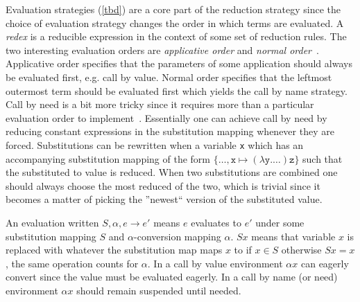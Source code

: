\documentclass[11pt,oneside,a4paper]{report}
\begin{document}
Evaluation strategies (\autoref{tbd}) are a core part of the reduction strategy since the choice of evaluation strategy changes the order in which terms are evaluated.
A \textit{redex} is a reducible expression in the context of some set of reduction rules.
The two interesting evaluation orders are \textit{applicative order} and \textit{normal order}~\cite{sestoft2002demonstrating}.
Applicative order specifies that the parameters of some application should always be evaluated first, e.g. call by value.
Normal order specifies that the leftmost outermost term should be evaluated first which yields the call by name strategy.
Call by need is a bit more tricky since it requires more than a particular evaluation order to implement~\cite{levy1988sharing}.
Essentially one can achieve call by need by reducing constant expressions in the substitution mapping whenever they are forced.
Substitutions can be rewritten when a variable \texttt{x} which has an accompanying substitution mapping of the form $\{ \dots, \texttt{x} \mapsto (\lambda\texttt{y}.\dots) \texttt{z} \}$ such that the substituted to value is reduced.
When two substitutions are combined one should always choose the most reduced of the two, which is trivial since it becomes a matter of picking the ''newest`` version of the substituted value.

An evaluation written $S, \alpha, e \rightarrow e'$ means $e$ evaluates to $e'$ under some substitution mapping $S$ and $\alpha$-conversion mapping $\alpha$.
$Sx$ means that variable $x$ is replaced with whatever the substitution map maps $x$ to if $x \in S$ otherwise $Sx = x$, the same operation counts for $\alpha$.
In a call by value environment $\alpha x$ can eagerly convert since the value must be evaluated eagerly.
In a call by name (or need) environment $\alpha x$ should remain suspended until needed.
\end{document}
